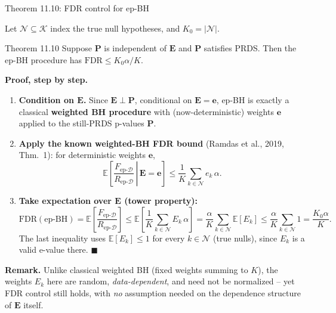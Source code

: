 \documentclass[aspectratio=169,10pt]{beamer}
\newcommand{\EE}{\mathbb{E}}
\newcommand{\1}{\mathbb{1}}
\begin{document}
\begin{frame}[allowframebreaks]{Theorem 11.10: FDR control for ep-BH}

Let $\mathcal N \subseteq \mathcal K$ index the true null hypotheses, and $K_0 = |\mathcal N|$.

\begin{block}{Theorem 11.10}
Suppose $\mathbf P$ is independent of $\mathbf E$ and $\mathbf P$ satisfies PRDS. Then the ep-BH procedure has $\mathrm{FDR} \le K_0\alpha/K$.
\end{block}

\textbf{Proof, step by step.}
\begin{enumerate}
\item \textbf{Condition on $\mathbf E$.} Since $\mathbf E \perp \mathbf P$, conditional on $\mathbf E=\mathbf e$, ep-BH is exactly a classical \textbf{weighted BH procedure} with (now-deterministic) weights $\mathbf e$ applied to the still-PRDS p-values $\mathbf P$.
\item \textbf{Apply the known weighted-BH FDR bound} (Ramdas et al., 2019, Thm.\ 1): for deterministic weights $\mathbf e$,
\[
\EE\left[\left.\frac{F_{\text{ep-}\mathcal D}}{R_{\text{ep-}\mathcal D}} \,\right|\, \mathbf E=\mathbf e\right] \le \frac{1}{K}\sum_{k\in\mathcal N} e_k\,\alpha.
\]
\item \textbf{Take expectation over $\mathbf E$ (tower property):}
\[
\mathrm{FDR}(\text{ep-BH}) = \EE\!\left[\frac{F_{\text{ep-}\mathcal D}}{R_{\text{ep-}\mathcal D}}\right] \le \EE\!\left[\frac{1}{K}\sum_{k\in\mathcal N} E_k\,\alpha\right] = \frac{\alpha}{K}\sum_{k\in\mathcal N}\EE[E_k] \le \frac{\alpha}{K}\sum_{k\in\mathcal N} 1 = \frac{K_0\alpha}{K}.
\]
The last inequality uses $\EE[E_k]\le 1$ for every $k\in\mathcal N$ (true nulls), since $E_k$ is a valid e-value there. $\blacksquare$
\end{enumerate}

\textbf{Remark.} Unlike classical weighted BH (fixed weights summing to $K$), the weights $E_k$ here are random, \emph{data-dependent}, and need not be normalized -- yet FDR control still holds, with \emph{no} assumption needed on the dependence structure of $\mathbf E$ itself.

\end{frame}
\end{document}
